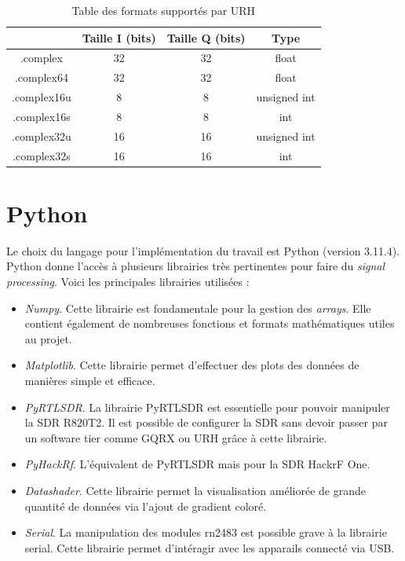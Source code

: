 \begin{table}[h]
\centering
\begin{adjustbox}{width=1\textwidth}
\begin{tabular}{|c|c|c|c|}
\hline
\multicolumn{1}{|c|}{} & \multicolumn{1}{c|}{Taille I (bits)} &\multicolumn{1}{c|}{Taille Q (bits)} & \multicolumn{1}{c|}{Type}\\
\hline
.complex & 32 & 32 & float \\
\hline
.complex64 & 32 & 32 & float\\
\hline
.complex16u & 8 & 8 & unsigned int\\
\hline
.complex16s &  8 & 8 & int\\
\hline
.complex32u & 16 & 16 & unsigned int \\
\hline
.complex32s & 16 & 16 & int  \\
\hline
\end{tabular}
\end{adjustbox}
\caption{Table des formats supportés par URH}
\label{format}
\end{table}



\section{Python}

Le choix du langage pour l'implémentation du travail est Python (version 3.11.4). Python donne l'accès à plusieurs librairies très pertinentes pour faire du \textit{signal processing}. Voici les principales librairies utilisées :

\vspace{0.1cm}

\begin{itemize}
\item \textit{Numpy}. Cette librairie est fondamentale pour la gestion des \textit{arrays}. Elle contient également de nombreuses fonctions et formats mathématiques utiles au projet.
\item \textit{Matplotlib}. Cette librairie permet d'effectuer des plots des données de manières simple et efficace.
\item \textit{PyRTLSDR}. La librairie PyRTLSDR est essentielle pour pouvoir manipuler la SDR R820T2. Il est possible de configurer la SDR sans devoir passer par un software tier comme GQRX ou URH grâce à cette librairie.
\item \textit{PyHackRf}. L'équivalent de PyRTLSDR mais pour la SDR HackrF One.
\item \textit{Datashader}. Cette librairie permet la visualisation améliorée de grande quantité de données via l'ajout de gradient coloré.
\item \textit{Serial}. La manipulation des modules rn2483 est possible grave à la librairie serial. Cette librairie permet d'intéragir avec les apparails connecté via USB.
\end{itemize}

